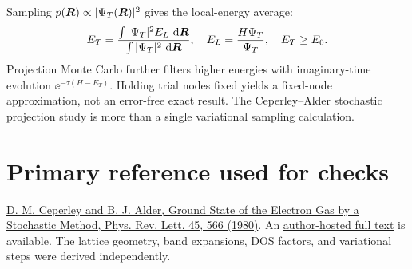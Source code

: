 Sampling $p(\boldsymbol{R})\propto|\Psi_T(\boldsymbol{R})|^2$ gives the local-energy average:
\[
E_T=\frac{\int|\Psi_T|^2E_L\,\mathop{}\!\mathrm{d}\boldsymbol{R}}{\int|\Psi_T|^2\,\mathop{}\!\mathrm{d}\boldsymbol{R}},\quad
E_L=\frac{H\Psi_T}{\Psi_T},\quad E_T\geq E_0.
\]
Projection Monte Carlo further filters higher energies with imaginary-time evolution $\ee^{-\tau(H-E_T)}$. Holding trial nodes fixed yields a fixed-node approximation, not an error-free exact result. The Ceperley--Alder stochastic projection study is more than a single variational sampling calculation.

\section*{Primary reference used for checks}
\href{https://journals.aps.org/prl/abstract/10.1103/PhysRevLett.45.566}{D. M. Ceperley and B. J. Alder, Ground State of the Electron Gas by a Stochastic Method, Phys. Rev. Lett. 45, 566 (1980)}.
An \href{https://people.physics.illinois.edu/Ceperley/papers/015.pdf}{author-hosted full text} is available. The lattice geometry, band expansions, DOS factors, and variational steps were derived independently.
